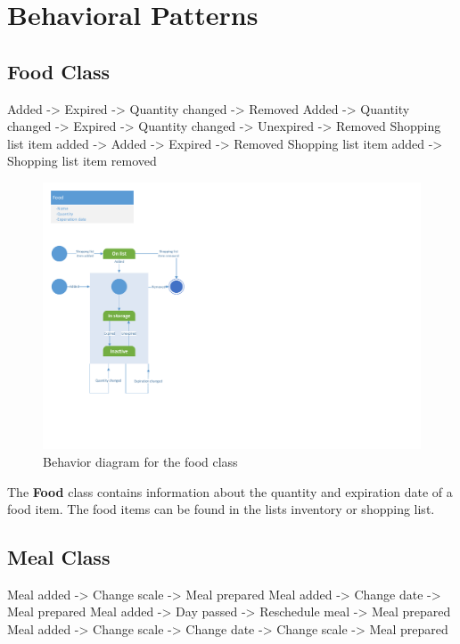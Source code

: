\section{Behavioral Patterns}

\subsection{Food Class}

Added -> Expired -> Quantity changed -> Removed
Added -> Quantity changed -> Expired -> Quantity changed -> Unexpired -> Removed
Shopping list item added -> Added -> Expired -> Removed
Shopping list item added -> Shopping list item removed

\begin{figure}[tbhp]
	\centering
	\includegraphics[clip=true, trim=0.5cm 4cm 18.5cm 0.5cm,  ]{Development/ProblemDomain/FoodClass.pdf}
	\caption{Behavior diagram for the food class} \label{FoodClass}
\end{figure}
The \textbf{Food} class contains information about the quantity and expiration date of a food item. The food items can be found in the lists inventory or shopping list.

\subsection{Meal Class}

Meal added -> Change scale -> Meal prepared
Meal added -> Change date -> Meal prepared
Meal added -> Day passed -> Reschedule meal -> Meal prepared
Meal added -> Change scale -> Change date -> Change scale -> Meal prepared

